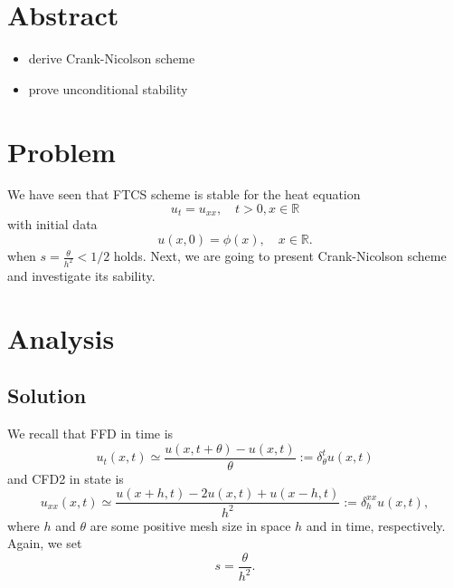 \documentclass{article}
\begin{document}
\section{Abstract}
\begin{itemize}
\item derive Crank-Nicolson scheme
\item prove unconditional stability
\end{itemize}

\section{Problem}
We have seen that FTCS scheme is stable for the heat equation
$$u_t = u_{xx}, \quad t>0, x\in \mathbb R$$
with initial data
$$
u(x, 0) = \phi(x), \quad x\in \mathbb R.
$$
when $s= \frac{\theta}{h^{2}} < 1/2$ holds.
Next, we are going to present Crank-Nicolson scheme and investigate its sability.




\section{Analysis}
\subsection{Solution}
We recall that FFD in time is
$$u_{t}(x, t) \simeq \frac{u(x, t+ \theta) - u(x, t)}{\theta} := 
\delta^{t}_{\theta} u (x, t)$$
and CFD2 in state is
$$u_{xx}(x, t) \simeq \frac{u(x+h, t) - 2u(x, t) + u(x-h, t)}{h^{2}}
:= \delta^{xx}_{h} u (x, t),$$
where $h$ and $\theta$ are some positive 
mesh size in space $h$ and in time, respectively. Again, we set
$$s = \frac{\theta}{h^{2}}.$$
\end{document}
